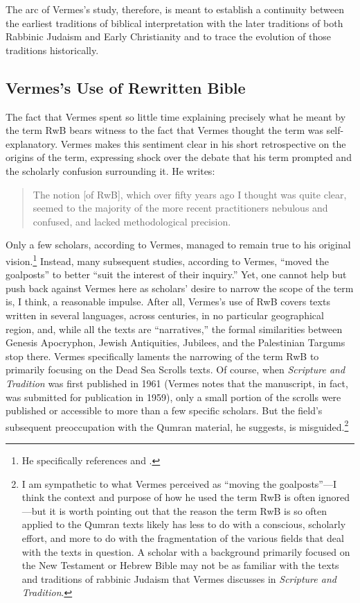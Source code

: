 The arc of Vermes's study, therefore, is meant to establish a continuity
between the earliest traditions of biblical interpretation with the
later traditions of both Rabbinic Judaism and Early Christianity and to
trace the evolution of those traditions historically.

\subsection{Vermes's Use of Rewritten Bible}\label{vermess-use-of-rwb}

The fact that Vermes spent so little time explaining precisely what he
meant by the term RwB bears witness to the fact that Vermes thought the
term was self-explanatory. Vermes makes this sentiment clear in his
short retrospective on the origins of the term, expressing shock over
the debate that his term prompted and the scholarly confusion
surrounding it. He writes:

\begin{quote}
The notion {[}of RwB{]}, which over fifty years ago I thought was quite
clear, seemed to the majority of the more recent practitioners nebulous
and confused, and lacked methodological
precision.\autocite[3]{vermes_zsengeller2014}
\end{quote}

Only a few scholars, according to Vermes, managed to remain true to his
original vision.\footnote{He specifically references
  \textcite{alexander_carson-williamson1988} and
  \textcite{bernstein_textus2005}.} Instead, many subsequent studies,
according to Vermes, ``moved the goalposts'' to better ``suit the
interest of their inquiry.''\autocite[4]{vermes_zsengeller2014} Yet, one
cannot help but push back against Vermes here as scholars' desire to
narrow the scope of the term is, I think, a reasonable impulse. After
all, Vermes's use of RwB covers texts written in several languages,
across centuries, in no particular geographical region, and, while all
the texts are ``narratives,'' the formal similarities between
Genesis Apocryphon, Jewish Antiquities, Jubilees, and the
Palestinian Targums stop there. Vermes specifically laments the
narrowing of the term RwB to primarily focusing on the Dead Sea Scrolls
texts. Of course, when \emph{Scripture and Tradition} was first
published in 1961 (Vermes notes that the manuscript, in fact, was
submitted for publication in 1959), only a small portion of the scrolls
were published or accessible to more than a few specific scholars. But
the field's subsequent preoccupation with the Qumran material, he
suggests, is misguided.\footnote{I am sympathetic to what Vermes
  perceived as ``moving the goalposts''---I think the context and
  purpose of how he used the term RwB is often ignored---but it is worth
  pointing out that the reason the term RwB is so often applied to the
  Qumran texts likely has less to do with a conscious, scholarly effort,
  and more to do with the fragmentation of the various fields that deal
  with the texts in question. A scholar with a background primarily
  focused on the New Testament or Hebrew Bible may not be as familiar
  with the texts and traditions of rabbinic Judaism that Vermes
  discusses in \emph{Scripture and Tradition}.}

